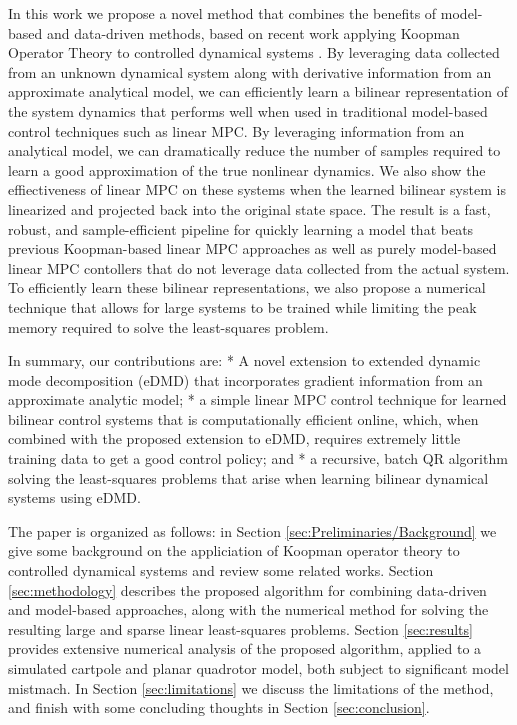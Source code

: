 \documentclass{article}
\begin{document}
    In this work we propose a novel method that combines the benefits of model-based and
    data-driven methods, based on recent work  applying Koopman Operator Theory to
    controlled dynamical systems 
    \cite{Meduri2022,Bruder2021,Korda2018,Folkestad2020,Suh2020}.
    By leveraging data collected from an
    unknown dynamical system along with derivative information from an approximate
    analytical model, we can efficiently learn a bilinear representation of the system
    dynamics that performs well when used in traditional model-based control techniques such
    as linear MPC. By leveraging information from an analytical model, we can dramatically
    reduce the number of samples required to learn a good approximation of the true
    nonlinear dynamics. We also show the effiectiveness of linear MPC on these systems 
    when the learned bilinear system is linearized and projected back into the original 
    state space. The result is a fast, robust, and sample-efficient pipeline for quickly 
    learning a model that beats previous Koopman-based linear MPC approaches as well as 
    purely model-based linear MPC contollers that do not leverage data collected from the 
    actual system. To efficiently learn these bilinear representations, we also propose 
    a numerical technique that allows for large systems to be trained while limiting the 
    peak memory required to solve the least-squares problem.

    In summary, our contributions are:
    * A novel extension to extended dynamic mode decomposition (eDMD) that incorporates 
      gradient information from an approximate analytic model;
    * a simple linear MPC control technique for learned bilinear control systems that is 
      computationally efficient online, which, when combined with the proposed extension 
      to eDMD, requires extremely little training data to get a good control policy; and
    * a recursive, batch QR algorithm solving the least-squares problems that arise 
      when learning bilinear dynamical systems using eDMD.
    
    The paper is organized as follows: in Section \ref{sec:Preliminaries/Background} we 
    give some background on the appliciation of Koopman operator theory to controlled 
    dynamical systems and review some related works. Section \ref{sec:methodology} describes
    the proposed algorithm for combining data-driven and model-based approaches, along with 
    the numerical method for solving the resulting large and sparse linear least-squares 
    problems. Section \ref{sec:results} provides extensive numerical analysis of the 
    proposed algorithm, applied to a simulated cartpole and planar quadrotor model, both 
    subject to significant model mistmach. In Section \ref{sec:limitations} we discuss the 
    limitations of the method, and finish with some concluding thoughts in Section 
    \ref{sec:conclusion}.
\end{document}
